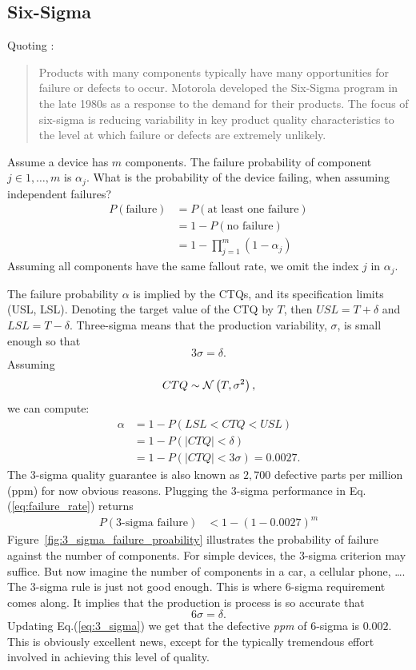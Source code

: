 \documentclass[12pt,a4paper]{report}
\theoremstyle{plain}
\theoremstyle{definition}
\newcommand{\targetValue}{T}\newcommand{\cp}{C_p}\newcommand{\cpHat}{\hat{C}_p}\newcommand{\ctqExpect}{\mu}
\providecommand{\DIFaddbegin}{} %
\providecommand{\DIFaddend}{} %
\providecommand{\DIFdelbegin}{} %
\providecommand{\DIFdelend}{} %
\begin{document}
\subsection{Six-Sigma}
\label{sec:six_sigma}

Quoting \cite{montgomery_introduction_2007}:
\begin{quote}
Products with many components typically have many opportunities for failure or defects to occur. Motorola developed the Six-Sigma program in the late 1980s as a response to the demand for their products. The focus of six-sigma is reducing variability in key product quality characteristics to the level at which failure or defects are extremely unlikely.
\end{quote}

Assume a device has $m$ components. 
The failure probability of component $j \in 1,\dots,m$ is $\alpha_j$.
What is the probability of the device failing, when assuming independent failures?
\begin{align}
\label{eq:failure_rate}
	P(\text{failure}) &= P(\text{at least one failure}) \\ \nonumber
	&= 1-P(\text{no failure}) \\ \nonumber
	&= 1-\prod_{j=1}^{m}(1-\alpha_j) 
\end{align}
Assuming all components have the same fallout rate, we omit the index $j$ in $\alpha_j$. 

The failure probability $\alpha$ is implied by the CTQs, and its specification limits (USL, LSL). 
Denoting the target value of the CTQ by $\targetValue$, then $USL=\targetValue + \delta$ and $LSL=T-\delta$.
Three-sigma means that the production variability, $\sigma$, is small enough so that $$3 \sigma = \delta.$$
Assuming $$CTQ \sim \DIFdelbegin %
\DIFdelend \DIFaddbegin \gauss{\targetValue, \sigma^2}\DIFaddend ,$$ we can compute:
\begin{align}
\label{eq:3_sigma}
	\alpha &= 1-P(LSL<CTQ<USL) \\ 
	& = 1-P(|CTQ| < \delta) \\ 
	&= 1- P(|CTQ| < 3 \sigma )= 0.0027.
\end{align}
The 3-sigma quality guarantee is also known as $2,700$ defective parts per million (ppm) for now obvious reasons.
Plugging the 3-sigma performance in Eq.(\ref{eq:failure_rate}) returns
\begin{align*}
	P(\text{3-sigma failure}) &< 1-(1-0.0027)^m
\end{align*}
Figure~\ref{fig:3_sigma_failure_proability} illustrates the probability of failure against the number of components. 
For simple devices, the 3-sigma criterion may suffice. 
But now imagine the number of components in a car, a cellular phone, \dots. The 3-sigma rule is just not good enough. 
This is where 6-sigma requirement comes along. It implies that the production is process is so accurate that 
$$6 \sigma = \delta.$$
Updating Eq.(\ref{eq:3_sigma}) we get that the defective \emph{ppm} of 6-sigma is $0.002$. 
This is obviously excellent news, except for the typically tremendous effort involved in achieving this level of quality.
\end{document}
